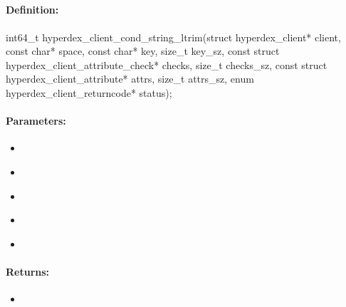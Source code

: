 \pagebreak
\subsection{}
\label{api:c:cond_string_ltrim}


\paragraph{Definition:}
\begin{ccode}
int64_t hyperdex_client_cond_string_ltrim(struct hyperdex_client* client,
        const char* space,
        const char* key, size_t key_sz,
        const struct hyperdex_client_attribute_check* checks, size_t checks_sz,
        const struct hyperdex_client_attribute* attrs, size_t attrs_sz,
        enum hyperdex_client_returncode* status);
\end{ccode}

\paragraph{Parameters:}
\begin{itemize}[noitemsep]
\item {}\\

\item {}\\

\item {}\\

\item {}\\

\item {}\\

\end{itemize}

\paragraph{Returns:}
\begin{itemize}[noitemsep]
\item {}\\

\end{itemize}

